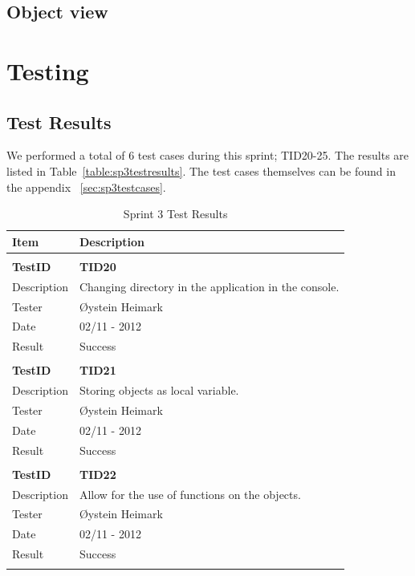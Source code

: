 \subsection{Object view}


\section{Testing}
\subsection{Test Results}
We performed a total of 6 test cases during this sprint; TID20-25. The results are listed in Table~\ref{table:sp3testresults}. The test cases themselves can be found in the appendix ~\ref{sec:sp3testcases}.

\begin{table}
\caption{Sprint 3 Test Results}
\centering
\begin{tabular}{ l p{13cm} }

\hline 
Item			&Description		\\
\hline \\ [-2.0ex]

\bf{TestID}		&\bf{TID20}			\\
Description	&Changing directory in the application in the console.	\\
Tester		&Øystein Heimark	\\
Date			&02/11 - 2012	\\
Result		&Success				\\
\hline \\ [-2.0ex]

\bf{TestID}		&\bf{TID21}			\\
Description	&Storing objects as local variable.  	\\
Tester		&Øystein Heimark	\\
Date			&02/11 - 2012	\\
Result		&Success			\\
\hline \\ [-2.0ex]

\bf{TestID}		&\bf{TID22}			\\
Description	&Allow for the use of functions on the objects.	\\
Tester		&Øystein Heimark	\\
Date			&02/11 - 2012	\\
Result		&Success			\\
\hline \\ [-2.0ex]


\end{tabular}
\end{table}
